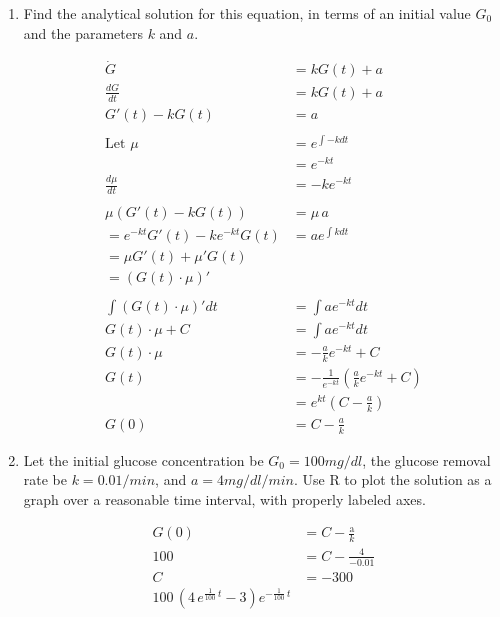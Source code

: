 \documentclass[10pt,letterpaper]{article}
\begin{document}
\begin{enumerate}
\begin{enumerate}
    \item Find the analytical solution for this equation, in terms of an initial value $G_0$ and the parameters $k$ and $a$.
    \begin{Solution}
      \begin{align*}
        \dot G &= k G(t) + a \\
        \frac{d G}{d t} &= k G(t) + a \\
        G'(t) - k G(t) &= a \\
        \\
        \text{Let } \mu &= e^{\int -k dt} \tag{integrating factor} \\
        &= e^{-kt} \\
        \frac{d \mu}{d t} &= -k e^{-kt} \\
        \\
        \mu \left( G'(t) - k G(t) \right) &= \mu \, a \\
        = e^{-kt} G'(t) - k e^{-kt} G(t) &= a e^{\int k dt}\\
        = \mu G'(t) + \mu' G(t) & \\
        = (G(t) \cdot \mu)'& \tag{product rule} \\
         \\
        \int \left(G(t) \cdot \mu \right)' dt &= \int {a e^{-kt} } dt \\
        G(t) \cdot \mu + C &=\int {a e^{-kt} } dt \\
        G(t) \cdot \mu &= - \frac{a}{k} e^{-kt} + C \\
        G(t) &= - \frac{1}{e^{-kt}} \left(\frac{a}{k}  e^{-kt} + C \right) \\
        &= e^{k t} \left(C - \frac{a}{k}\right) \\
        G(0) &= C - \frac{a}{k}
      \end{align*}
    \end{Solution}
    \item Let the initial glucose concentration be $G_0 = 100 mg/dl$, the glucose removal rate be $k = 0.01 / min$, and $a = 4 mg/dl/min$. Use R to plot the solution as a graph over a reasonable time interval, with properly labeled axes.
    \begin{Solution}
      \begin{align}
        G(0) &= C - \frac{\mbox{a}}{k} \\
        100 &= C - \frac{4}{-0.01} \\
        C &= -300 \\
        100 \, {(4 \, e^{\frac{1}{100} \, t} - 3)} e^{-\frac{1}{100} \, t}
      \end{align}


\end{Solution}
\end{enumerate}
\end{enumerate}
\end{document}

